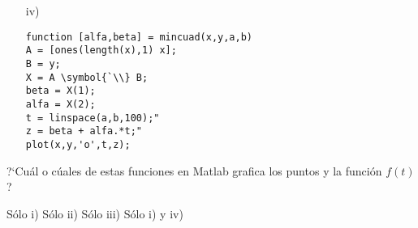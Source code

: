 \begin{pregunta}
\begin{cuerpo}
\begin{minipage}{1.15\textwidth}
\begin{multicols}{2}
\begin{itemize}
\item[iv)] \hspace{0.025\textwidth}
\begin{minipage}{0.4\textwidth}
\begin{lstlisting}
function [alfa,beta] = mincuad(x,y,a,b)
A = [ones(length(x),1) x];
B = y;
X = A \symbol{`\\} B;
beta = X(1);
alfa = X(2);
t = linspace(a,b,100);"
z = beta + alfa.*t;"
plot(x,y,'o',t,z);
\end{lstlisting}
\end{minipage}

\end{itemize}
\end{multicols}

\end{minipage}
\end{cuerpo}
\bigskip

 ?`Cu\'al o c\'uales de estas funciones en Matlab grafica los puntos y la funci\'on $f(t)$?
 
\begin{multicols}{2}
\begin{alternativas}
{S\'olo i)} %
{S\'olo ii)}
{S\'olo iii)}
{S\'olo i) y iv)}
\end{alternativas}
\end{multicols}
\justificacion{0cm}
\end{pregunta}

